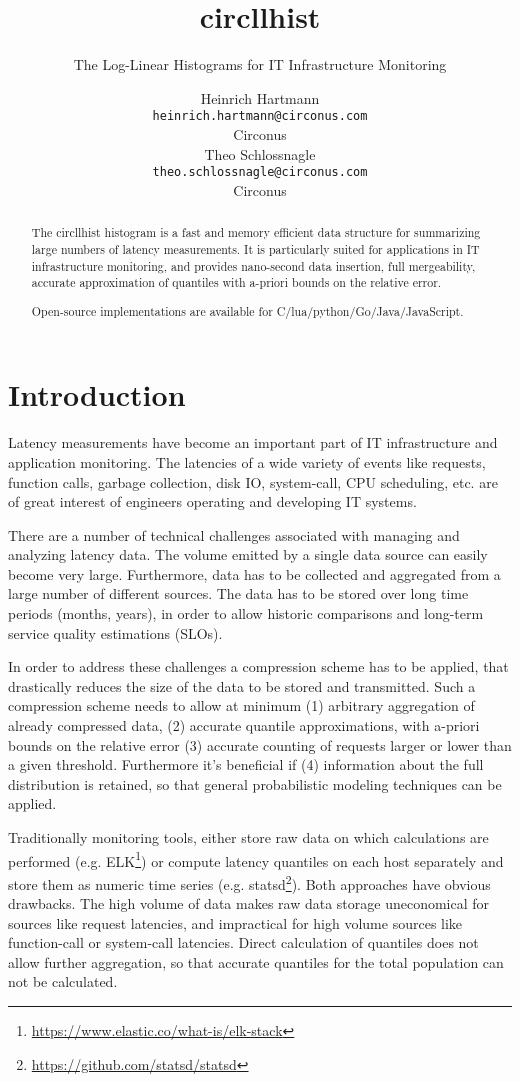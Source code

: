 \documentclass{article}
\title{circllhist}
\subtitle{The Log-Linear Histograms for IT Infrastructure Monitoring}
\author{
  Heinrich Hartmann \\
  \texttt{heinrich.hartmann@circonus.com} \\
  Circonus \\
  \And
  Theo Schlossnagle \\
  \texttt{theo.schlossnagle@circonus.com} \\
  Circonus
}
\theoremstyle{plain}
\theoremstyle{remark}
\begin{document}
\maketitle

\begin{abstract}
  The circllhist histogram is a fast and memory efficient data structure for summarizing large
  numbers of latency measurements.  It is particularly suited for applications in IT infrastructure
  monitoring, and provides nano-second data insertion, full mergeability, accurate approximation of
  quantiles with a-priori bounds on the relative error.

  Open-source implementations are available for C/lua/python/Go/Java/JavaScript.
\end{abstract}

\section{Introduction}

Latency measurements have become an important part of IT infrastructure and application monitoring.
The latencies of a wide variety of events like requests, function calls, garbage collection, disk
IO, system-call, CPU scheduling, etc. are of great interest of engineers operating and developing IT systems.

There are a number of technical challenges associated with managing and analyzing latency data.  The
volume emitted by a single data source can easily become very large.  Furthermore, data has to be
collected and aggregated from a large number of different sources.  The data has to be stored over
long time periods (months, years), in order to allow historic comparisons and long-term service
quality estimations (SLOs).

In order to address these challenges a compression scheme has to be applied, that drastically
reduces the size of the data to be stored and transmitted.  Such a compression scheme needs to allow
at minimum (1) arbitrary aggregation of already compressed data, (2) accurate quantile
approximations, with a-priori bounds on the relative error (3) accurate counting of requests larger
or lower than a given threshold. Furthermore it's beneficial if (4) information about the full
distribution is retained, so that general probabilistic modeling techniques can be applied.

Traditionally monitoring tools, either store raw data on which calculations are performed (e.g.
ELK\footnote{\url{https://www.elastic.co/what-is/elk-stack}}) or compute latency quantiles on each host
separately and store them as numeric time series
(e.g. statsd\footnote{\url{https://github.com/statsd/statsd}}).  Both approaches have obvious
drawbacks.  The high volume of data makes raw data storage uneconomical for sources like request
latencies, and impractical for high volume sources like function-call or system-call latencies.
Direct calculation of quantiles does not allow further aggregation, so that accurate quantiles for
the total population can not be calculated.
\end{document}
